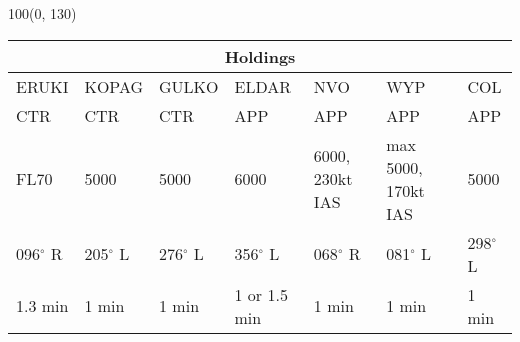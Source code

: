\documentclass[10pt,landscape,a4paper]{article}
\begin{document}
\begin{textblock}{100}(0, 130)
\begin{table}[]
\begin{tabular}{lllllll} 
\multicolumn{7}{c}{\textbf{Holdings}}                                                                                                                                          \\ \hline
\multicolumn{1}{|l|}{ERUKI} &                                                                                                                                              
\multicolumn{1}{l|}{KOPAG} &                                                                                                                                            
\multicolumn{1}{l|}{GULKO} &                                                                                                                                              
\multicolumn{1}{l|}{ELDAR} &                                                                                                                                       
\multicolumn{1}{l|}{NVO} & 
\multicolumn{1}{l|}{WYP} & 
\multicolumn{1}{l|}{COL} \\ \hline
\multicolumn{1}{|l|}{CTR} & 
\multicolumn{1}{l|}{CTR} & 
\multicolumn{1}{l|}{CTR} & 
\multicolumn{1}{l|}{APP} & 
\multicolumn{1}{l|}{APP} & 
\multicolumn{1}{l|}{APP} & 
\multicolumn{1}{l|}{APP} \\
\multicolumn{1}{|l|}{FL70} & 
\multicolumn{1}{l|}{5000} & 
\multicolumn{1}{l|}{5000} & 
\multicolumn{1}{l|}{6000} & 
\multicolumn{1}{l|}{6000, 230kt IAS} & 
\multicolumn{1}{l|}{max 5000, 170kt IAS} & 
\multicolumn{1}{l|}{5000} \\
\multicolumn{1}{|l|}{096$^\circ$ R} & 
\multicolumn{1}{l|}{205$^\circ$ L} & 
\multicolumn{1}{l|}{276$^\circ$ L} & 
\multicolumn{1}{l|}{356$^\circ$ L} & 
\multicolumn{1}{l|}{068$^\circ$ R} & 
\multicolumn{1}{l|}{081$^\circ$ L} & 
\multicolumn{1}{l|}{298$^\circ$ L} \\
\multicolumn{1}{|l|}{1.3 min} & 
\multicolumn{1}{l|}{1 min} & 
\multicolumn{1}{l|}{1 min} & 
\multicolumn{1}{l|}{1 or 1.5 min} & 
\multicolumn{1}{l|}{1 min} & 
\multicolumn{1}{l|}{1 min} & 
\multicolumn{1}{l|}{1 min} \\ \hline
\end{tabular}
\end{table}
\end{textblock}
\end{document}

